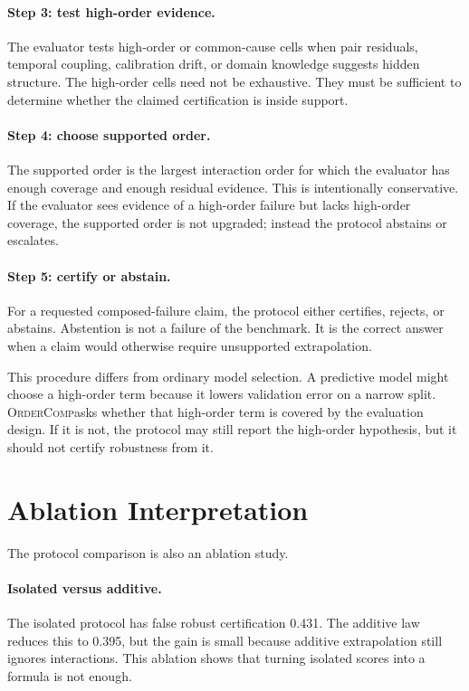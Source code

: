 \documentclass{article}
\newcommand{\method}{\textsc{OrderComp}}
\begin{document}
\paragraph{Step 3: test high-order evidence.}
The evaluator tests high-order or common-cause cells when pair residuals, temporal coupling, calibration drift, or domain knowledge suggests hidden structure. The high-order cells need not be exhaustive. They must be sufficient to determine whether the claimed certification is inside support.

\paragraph{Step 4: choose supported order.}
The supported order is the largest interaction order for which the evaluator has enough coverage and enough residual evidence. This is intentionally conservative. If the evaluator sees evidence of a high-order failure but lacks high-order coverage, the supported order is not upgraded; instead the protocol abstains or escalates.

\paragraph{Step 5: certify or abstain.}
For a requested composed-failure claim, the protocol either certifies, rejects, or abstains. Abstention is not a failure of the benchmark. It is the correct answer when a claim would otherwise require unsupported extrapolation.

This procedure differs from ordinary model selection. A predictive model might choose a high-order term because it lowers validation error on a narrow split. \method asks whether that high-order term is covered by the evaluation design. If it is not, the protocol may still report the high-order hypothesis, but it should not certify robustness from it.

\section{Ablation Interpretation}

The protocol comparison is also an ablation study.

\paragraph{Isolated versus additive.}
The isolated protocol has false robust certification 0.431. The additive law reduces this to 0.395, but the gain is small because additive extrapolation still ignores interactions. This ablation shows that turning isolated scores into a formula is not enough.
\end{document}
